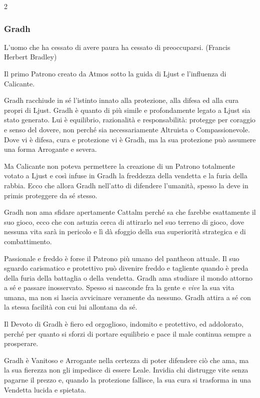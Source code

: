 \begin{multicols}{2}
\subsubsection{Gradh}\label{gradh}\hypertarget{gradh}{}

\begin{enfasi}
L'uomo che ha cessato di avere paura ha cessato di preoccuparsi. (Francis Herbert Bradley)
\end{enfasi}

Il primo Patrono creato da Atmos sotto la guida di Ljust e l'influenza di Calicante.

Gradh racchiude in sé l'istinto innato alla protezione, alla difesa ed alla cura propri di Ljust. Gradh è quanto di più simile e profondamente legato a Ljust sia stato generato. Lui è equilibrio, razionalità e responsabilità: protegge per coraggio e senso del dovere, non perché sia necessariamente Altruista o Compassionevole.
Dove vi è difesa, cura e protezione vi è Gradh, ma la sua protezione può assumere una forma Arrogante e severa.

Ma Calicante non poteva permettere la creazione di un Patrono totalmente votato a Ljust e così infuse in Gradh la freddezza della vendetta e la furia della rabbia. Ecco che allora Gradh nell'atto di difendere l'umanità, spesso la deve in primis proteggere da sé stesso.

Gradh non ama sfidare apertamente Cattalm perché sa che farebbe esattamente il suo gioco, ecco che con astuzia cerca di attirarlo nel suo terreno di gioco, dove nessuna vita sarà in pericolo e lì dà sfoggio della sua superiorità strategica e di combattimento.

Passionale e freddo è forse il Patrono più umano del pantheon attuale. Il suo sguardo carismatico e protettivo può divenire freddo e tagliente quando è preda della furia della battaglia o della vendetta. Gradh ama studiare il mondo attorno a sé e passare inosservato. Spesso si nasconde fra la gente e \emph{vive} la sua vita umana, ma non si lascia avvicinare veramente da nessuno. Gradh attira a sé con la stessa facilità con cui lui allontana da sé.

Il Devoto di Gradh è fiero ed orgoglioso, indomito e protettivo, ed addolorato, perché per quanto si sforzi di portare equilibrio e pace il male continua sempre a prosperare.

Gradh è Vanitoso e Arrogante nella certezza di poter difendere ciò che ama, ma la sua fierezza non gli impedisce di essere Leale. Invidia chi distrugge vite senza pagarne il prezzo e, quando la protezione fallisce, la sua cura si trasforma in una Vendetta lucida e spietata.


\end{multicols}
